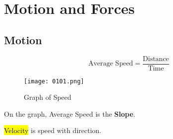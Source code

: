 \chapter{Motion and Forces}

\section{Motion}

\begin{tcolorbox}[colback=red!5!white,colframe=red!75!black]
  \[\text{Average Speed}=\frac{\text{Distance}}{\text{Time}}\]
\end{tcolorbox}

\vspace{.5cm}

\begin{figure}[htb!]
  \centering
  \texttt{[image: 0101.png]}
  \caption{Graph of Speed}
\end{figure}

On the graph, Average Speed is the \textbf{Slope}.

\vspace{.5cm}

\hl{Velocity} is speed with direction.

